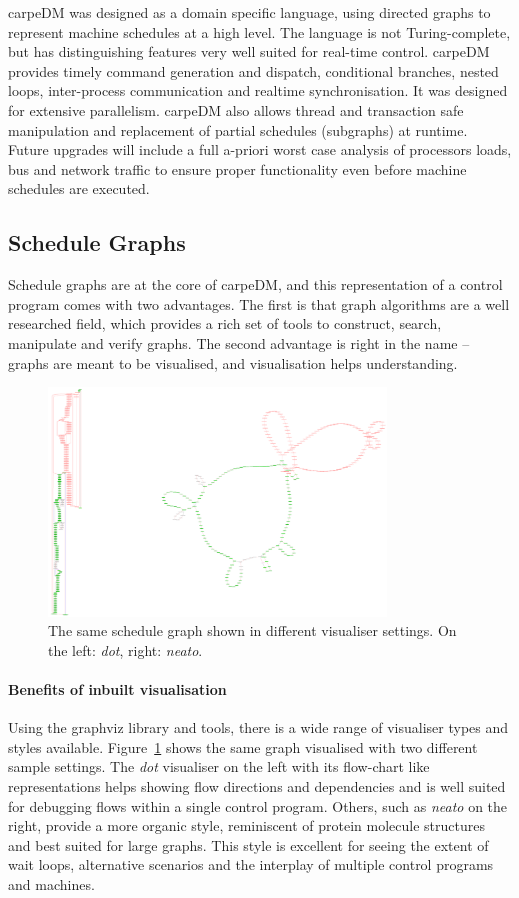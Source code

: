 carpeDM was designed as a domain specific language, using directed graphs to represent machine schedules at a high level. The language is not Turing-complete, but has distinguishing features very well suited for real-time control. carpeDM provides timely command generation and dispatch, conditional branches, nested loops, inter-process communication and realtime synchronisation. It was designed for extensive parallelism.
carpeDM also allows thread and transaction safe manipulation and replacement of partial schedules (subgraphs) at runtime. Future upgrades will include a full a-priori worst case analysis of processors loads, bus and network traffic to ensure
proper functionality even before machine schedules are executed.

\subsection{Schedule Graphs}
Schedule graphs are at the core of carpeDM, and this representation of a control program comes with two advantages. The first is that graph algorithms are a well researched field, which provides a rich set of tools to construct, search, manipulate and
verify graphs. The second advantage is right in the name -- graphs are meant to be visualised, and visualisation helps understanding.
\begin{figure}[H]
   \centering
   \includegraphics*[width=0.8\textwidth,keepaspectratio]{Figures/vis_dot_vs_neato}
   \caption{The same schedule graph shown in different visualiser settings. On the left: \emph{dot}, right: \emph{neato}. %
    }
   \label{fig:dot_vs_neato}
\end{figure}
\paragraph{Benefits of inbuilt visualisation}
Using the graphviz library and tools, there is a wide range of visualiser types and styles available. Figure~\ref{fig:dot_vs_neato} shows the same graph visualised with two different sample settings. The \emph{dot} visualiser on the left with its flow-chart like representations helps showing flow directions and dependencies and is well suited for debugging flows within a single control program. Others, such as \emph{neato} on the right, provide a more organic style, reminiscent of protein molecule structures and best suited for large graphs. This style is excellent for seeing the extent of wait loops, alternative scenarios and the interplay of multiple control programs and machines.

